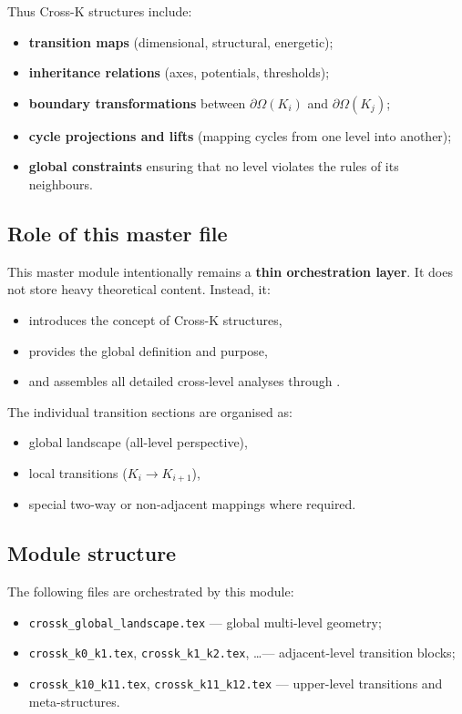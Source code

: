 Thus Cross-K structures include:
\begin{itemize}
  \item \textbf{transition maps} (dimensional, structural, energetic);
  \item \textbf{inheritance relations} (axes, potentials, thresholds);
  \item \textbf{boundary transformations} between $\partial\Omega(K_i)$ and
        $\partial\Omega(K_j)$;
  \item \textbf{cycle projections and lifts} (mapping cycles from one level
        into another);
  \item \textbf{global constraints} ensuring that no level violates the
        rules of its neighbours.
\end{itemize}

\subsection{Role of this master file}
This master module intentionally remains a \textbf{thin orchestration layer}.  
It does not store heavy theoretical content. Instead, it:
\begin{itemize}
  \item introduces the concept of Cross-K structures,
  \item provides the global definition and purpose,
  \item and assembles all detailed cross-level analyses through \verb||.
\end{itemize}

The individual transition sections are organised as:
\begin{itemize}
  \item global landscape (all-level perspective),
  \item local transitions ($K_i \rightarrow K_{i+1}$),
  \item special two-way or non-adjacent mappings where required.
\end{itemize}

\subsection{Module structure}
\noindent The following files are orchestrated by this module:
\begin{itemize}
  \item \verb|crossk_global_landscape.tex| — global multi-level geometry;
  \item \verb|crossk_k0_k1.tex|, \verb|crossk_k1_k2.tex|, \dots —
        adjacent-level transition blocks;
  \item \verb|crossk_k10_k11.tex|, \verb|crossk_k11_k12.tex| — upper-level
        transitions and meta-structures.
\end{itemize}

